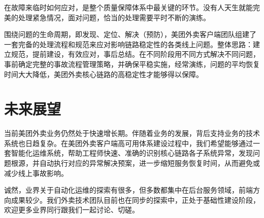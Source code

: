 \documentclass[12pt]{article}
\begin{document}
在故障来临时如何应对，是整个质量保障体系中最关键的环节。没有人天生就能完美的处理紧急情况，面对问题，恰当的处理需要平时不断的演练。

围绕问题的生命周期，即发现、定位、解决（预防），美团外卖客户端团队组建了一套完备的处理流程和规范来应对影响链路稳定性的各类线上问题。整体思路：建立规范，提前建设，有效应对，事后总结。在不同阶段用不同方式解决不同问题，事前确定完整的事故流程管理策略，并确保平稳实施，经常演练，问题的平均恢复时间大大降低，美团外卖核心链路的高稳定性才能够得以保障。

\section{未来展望}
当前美团外卖业务仍然处于快速增长期。伴随着业务的发展，背后支持业务的技术系统也日趋复杂。在美团外卖客户端高可用体系建设过程中，我们希望能够通过一套智能化运维系统，帮助工程师快速、准确的识别核心链路各子系统异常，发现问题根源，并自动执行对应的异常解决预案，进一步缩短服务恢复时间，从而避免或减少线上事故影响。

诚然，业界关于自动化运维的探索有很多，但多数都集中在后台服务领域，前端方向成果较少。我们外卖技术团队目前也在同步的探索中，正处于基础性建设阶段，欢迎更多业界同行跟我们一起讨论、切磋。



\end{document}
